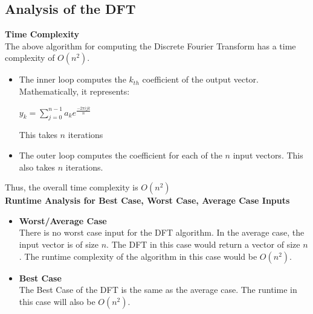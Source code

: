 \documentclass{article}
\begin{document}
\subsection{Analysis of the DFT}
\textbf{Time Complexity} \\
The above algorithm for computing the Discrete Fourier Transform has a time complexity of $O(n^{2})$. 
\begin{itemize}
\item The inner loop computes the $k_{th}$ coefficient of the output vector. Mathematically, it represents:
\begin{center}
$y_{k}=\sum_{j=0}^{n-1}a_{k}e^{\frac{-2\pi ijk}{n}}$
\end{center}
This takes $n$ iterations
\item
The outer loop computes the coefficient for each of the $n$ input vectors. This also takes $n$ iterations.
\end{itemize}

Thus, the overall time complexity is $O(n^{2})$ \\

\textbf{Runtime Analysis for Best Case, Worst Case, Average Case Inputs}
\begin{itemize}
\item
\textbf{Worst/Average Case} \\
There is no worst case input for the DFT algorithm. In the average case, the input vector is of size $n$. The DFT in this case would return a vector of size $n$. The runtime complexity of the algorithm in this case would be $O(n^{2})$.
\item
\textbf{Best Case} \\
The Best Case of the DFT is the same as the average case. The runtime in this case will also be $O(n^{2})$.
\end{itemize}
\end{document}
